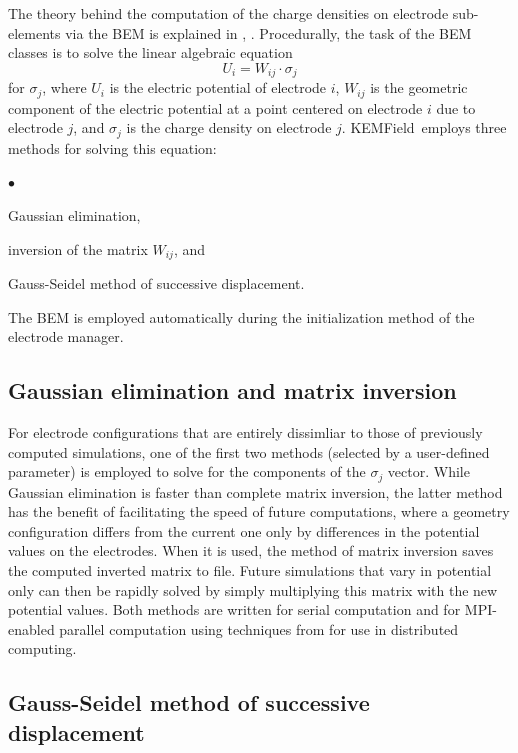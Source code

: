 \documentclass[11pt,a4paper,oneside]{article}
\newcommand{\kemfield}    {{\sc KEMField}}
\newcommand{\squishlist}{
   \begin{list}{$\bullet$}
    { \setlength{\itemsep}{0pt}      \setlength{\parsep}{3pt}
      \setlength{\topsep}{3pt}       \setlength{\partopsep}{0pt}
      \setlength{\leftmargin}{1.5em} \setlength{\labelwidth}{1em}
      \setlength{\labelsep}{0.5em} } }
\newcommand{\squishend}{
    \end{list}  }
\begin{document}
The theory behind the computation of the charge densities on electrode sub-elements via the BEM is explained in \cite{Glueck5}, \cite{Corona}.  Procedurally, the task of the BEM classes is to solve the linear algebraic equation
%
\begin{equation}
U_{i} = W_{ij} \cdot \sigma_{j}
\label{eq:BEMLinAlg}
\end{equation}
%
for $\sigma_{j}$, where $U_{i}$ is the electric potential of electrode $i$, $W_{ij}$ is the geometric component of the electric potential at a point centered on electrode $i$ due to electrode $j$, and $\sigma_{j}$ is the charge density on electrode $j$.  \kemfield\ employs three methods for solving this equation:
%
\squishlist
\item Gaussian elimination, 
\item inversion of the matrix $W_{ij}$, and
\item Gauss-Seidel method of successive displacement.  
\squishend
%
The BEM is employed automatically during the initialization method of the electrode manager.  

\subsection{Gaussian elimination and matrix inversion}
\label{subsec:gaussianElimMatrixInvert}

For electrode configurations that are entirely dissimliar to those of previously computed simulations, one of the first two methods (selected by a user-defined parameter) is employed to solve for the components of the $\sigma_{j}$ vector.  While Gaussian elimination is faster than complete matrix inversion, the latter method has the benefit of facilitating the speed of future computations, where a geometry configuration differs from the current one only by differences in the potential values on the electrodes.  When it is used, the method of matrix inversion saves the computed inverted matrix to file.  Future simulations that vary in potential only can then be rapidly solved by simply multiplying this matrix with the new potential values.  Both methods are written for serial computation and for MPI-enabled parallel computation using techniques from \cite{Karniadakis} for use in distributed computing.  

\subsection{Gauss-Seidel method of successive displacement}
\label{subsec:gaussSeidel}
\end{document}
